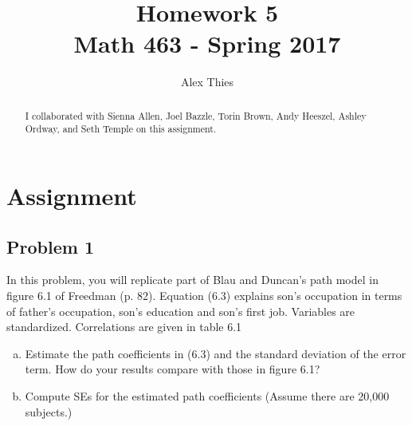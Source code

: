 \documentclass{amsart}
\author{Alex Thies}
\title{Homework 5 \\ Math 463 - Spring 2017}
\begin{document}
	\begin{abstract}
		I collaborated with Sienna Allen, Joel Bazzle, Torin Brown, Andy Heeszel, Ashley Ordway, and Seth Temple on this assignment.
	\end{abstract}

	\maketitle

	\section{Assignment} %
	\label{sec:assignment}
		\subsection*{Problem 1} %
		\label{sub:problem_1}
			In this problem, you will replicate part of Blau and Duncan’s path model in figure 6.1 of Freedman (p. 82). 
			Equation (6.3) explains son’s occupation in terms of father’s occupation, son’s education and son’s first job. 
			Variables are standardized. 
			Correlations are given in table 6.1
			\begin{enumerate}[(a)]
				\item Estimate the path coefficients in (6.3) and the standard deviation of the error term. 
				How do your results compare with those in figure 6.1?
				\item Compute SEs for the estimated path coefficients (Assume there are 20,000 subjects.)
			\end{enumerate}
\end{document}
